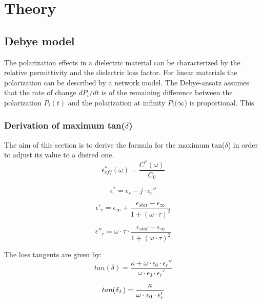 \chapter{Theory}
\section{Debye model}
The polarization effects in a dielectric material can be characterized by the relative permittivity and the dielectric loss factor. 
For linear materials the polarization can be described by a network model. The Debye-ansatz assumes that the rate of change $ dP_i/dt$ is of the remaining difference between the polarization $P_i(t)$ and the polarization at infinity $P_i(\infty$) is proportional. This

\subsection{Derivation of maximum tan($\delta$)}
The aim of this section is to derive the formula for the maximum tan($\delta$) in order to adjust its value to a disired one.
\begin{equation}
\epsilon_{eff}^* (\omega) = \frac{C^*(\omega)}{C_0}
\end{equation}

\begin{equation}
\epsilon^* = \epsilon_r-j \cdot \epsilon_r''
\end{equation}


\begin{equation}
\epsilon'_r = \epsilon_{\infty} + \frac{\epsilon_{stat}-\epsilon_{\infty}}{1+(\omega \cdot \tau )^2}
\end{equation}

\begin{equation}
\epsilon''_r = \omega \cdot \tau \cdot \frac{\epsilon_{stat}-\epsilon_{\infty}}{1+(\omega \cdot \tau )^2}
\end{equation}


The loss tangents are given by:
\begin{equation}
tan (\delta) = \frac{\kappa + \omega \cdot \epsilon_0 \cdot \epsilon _r ''}{\omega \cdot \epsilon_0 \cdot \epsilon _r '}
\end{equation}

\begin{equation}
tan (\delta_{L}) = \frac{\kappa}{\omega \cdot \epsilon_0 \cdot \epsilon_r'} \newline
\end{equation}


